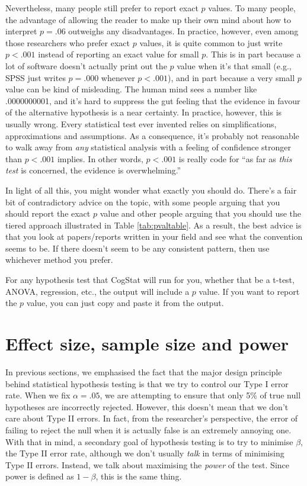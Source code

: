 \documentclass[
]{book}
\theoremstyle{definition}
\theoremstyle{definition}
\theoremstyle{definition}
\theoremstyle{definition}
\theoremstyle{remark}
\begin{document}
Nevertheless, many people still prefer to report exact \(p\) values. To many people, the advantage of allowing the reader to make up their own mind about how to interpret \(p = .06\) outweighs any disadvantages. In practice, however, even among those researchers who prefer exact \(p\) values, it is quite common to just write \(p<.001\) instead of reporting an exact value for small \(p\). This is in part because a lot of software doesn't actually print out the \(p\) value when it's that small (e.g., SPSS just writes \(p = .000\) whenever \(p<.001\)), and in part because a very small \(p\) value can be kind of misleading. The human mind sees a number like .0000000001, and it's hard to suppress the gut feeling that the evidence in favour of the alternative hypothesis is a near certainty. In practice, however, this is usually wrong. Every statistical test ever invented relies on simplifications, approximations and assumptions. As a consequence, it's probably not reasonable to walk away from \emph{any} statistical analysis with a feeling of confidence stronger than \(p<.001\) implies. In other words, \(p<.001\) is really code for ``as far as \emph{this test} is concerned, the evidence is overwhelming.''

In light of all this, you might wonder what exactly you should do. There's a fair bit of contradictory advice on the topic, with some people arguing that you should report the exact \(p\) value and other people arguing that you should use the tiered approach illustrated in Table \ref{tab:pvaltable}. As a result, the best advice is that you look at papers/reports written in your field and see what the convention seems to be. If there doesn't seem to be any consistent pattern, then use whichever method you prefer.

For any hypothesis test that CogStat will run for you, whether that be a t-test, ANOVA, regression, etc., the output will include a \(p\) value. If you want to report the \(p\) value, you can just copy and paste it from the output.

\hypertarget{effectsize}{%
\section{Effect size, sample size and power}\label{effectsize}}

In previous sections, we emphasised the fact that the major design principle behind statistical hypothesis testing is that we try to control our Type I error rate. When we fix \(\alpha = .05\), we are attempting to ensure that only 5\% of true null hypotheses are incorrectly rejected. However, this doesn't mean that we don't care about Type II errors. In fact, from the researcher's perspective, the error of failing to reject the null when it is actually false is an extremely annoying one. With that in mind, a secondary goal of hypothesis testing is to try to minimise \(\beta\), the Type II error rate, although we don't usually \emph{talk} in terms of minimising Type II errors. Instead, we talk about maximising the \emph{power} of the test. Since power is defined as \(1-\beta\), this is the same thing.
\end{document}
